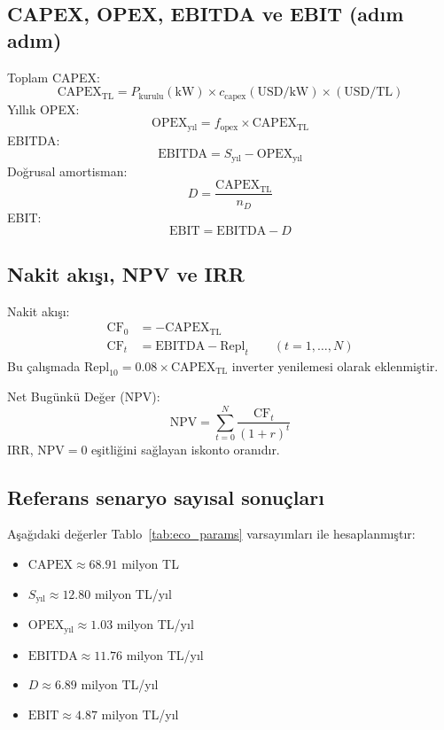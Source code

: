 \documentclass[12pt,a4paper]{article}
\begin{document}
\subsection{CAPEX, OPEX, EBITDA ve EBIT (adım adım)}
Toplam CAPEX:
\begin{equation}
\mathrm{CAPEX}_{\text{TL}} = P_{\text{kurulu}}(\text{kW}) \times c_{\text{capex}}(\text{USD/kW}) \times (\text{USD/TL})
\end{equation}
Yıllık OPEX:
\begin{equation}
\mathrm{OPEX}_{\text{yıl}} = f_{\text{opex}} \times \mathrm{CAPEX}_{\text{TL}}
\end{equation}
EBITDA:
\begin{equation}
\mathrm{EBITDA} = S_{\text{yıl}} - \mathrm{OPEX}_{\text{yıl}}
\end{equation}
Doğrusal amortisman:
\begin{equation}
D = \frac{\mathrm{CAPEX}_{\text{TL}}}{n_D}
\end{equation}
EBIT:
\begin{equation}
\mathrm{EBIT} = \mathrm{EBITDA} - D
\end{equation}

\subsection{Nakit akışı, NPV ve IRR}
Nakit akışı:
\begin{align}
\mathrm{CF}_0 &= -\mathrm{CAPEX}_{\text{TL}} \\
\mathrm{CF}_t &= \mathrm{EBITDA} - \mathrm{Repl}_t \qquad (t=1,\dots,N)
\end{align}
Bu çalışmada $\mathrm{Repl}_{10}=0.08\times \mathrm{CAPEX}_{\text{TL}}$ inverter yenilemesi olarak eklenmiştir.

Net Bugünkü Değer (NPV):
\begin{equation}
\mathrm{NPV} = \sum_{t=0}^{N} \frac{\mathrm{CF}_t}{(1+r)^t}
\end{equation}
IRR, $\mathrm{NPV}=0$ eşitliğini sağlayan iskonto oranıdır.

\subsection{Referans senaryo sayısal sonuçları}
Aşağıdaki değerler Tablo~\ref{tab:eco_params} varsayımları ile hesaplanmıştır:
\begin{itemize}
\item $\mathrm{CAPEX} \approx \mathbf{68.91}$ milyon TL
\item $S_{\text{yıl}} \approx \mathbf{12.80}$ milyon TL/yıl
\item $\mathrm{OPEX}_{\text{yıl}} \approx \mathbf{1.03}$ milyon TL/yıl
\item $\mathrm{EBITDA} \approx \mathbf{11.76}$ milyon TL/yıl
\item $D \approx \mathbf{6.89}$ milyon TL/yıl
\item $\mathrm{EBIT} \approx \mathbf{4.87}$ milyon TL/yıl
\end{itemize}
\end{document}

